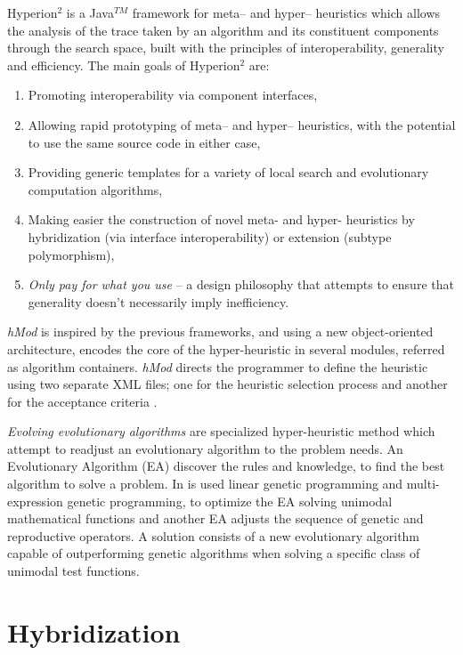 {\sc Hyperion}$^2$ \cite{Brownlee2014} is a Java$^{TM}$ framework for meta-- and hyper-- heuristics which allows the analysis of the trace taken by an algorithm and its constituent components through the search space, built with the principles of interoperability, generality and efficiency. The main goals of {\sc Hyperion}$^2$ are:
\begin{enumerate} %
\item Promoting interoperability via component interfaces,
\item Allowing rapid prototyping of meta-- and hyper-- heuristics, with the potential to use the same source code in either case,
\item Providing generic templates for a variety of local search and evolutionary computation algorithms,
\item Making easier the construction of novel meta- and hyper- heuristics by hybridization (via interface interoperability) or extension (subtype polymorphism),
\item {\it Only pay for what you use} -- a design philosophy that attempts to ensure that generality doesn't necessarily imply inefficiency.
\end{enumerate}%

\textit{hMod} is inspired by the previous frameworks, and using a new object-oriented architecture, encodes the core of the hyper-heuristic in several modules, referred as algorithm containers. \textit{hMod} directs the programmer to define the heuristic using two separate XML files; one for the heuristic selection process and another for the acceptance criteria \cite{Urra2013}.

\textit{Evolving evolutionary algorithms} are specialized hyper-heuristic method which attempt to readjust an evolutionary algorithm to the problem needs. An Evolutionary Algorithm (EA) discover the rules and knowledge, to find the best algorithm to solve a problem. In \cite{Diosan2009} is used linear genetic programming and multi-expression genetic programming, to optimize the EA solving unimodal mathematical functions and another EA adjusts the sequence of genetic and reproductive operators. A solution consists of a new evolutionary algorithm capable of outperforming genetic algorithms when solving a specific class of unimodal test functions. 

\section{Hybridization}
\label{sec:hybrid}


